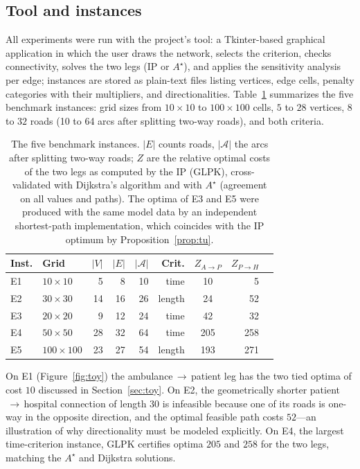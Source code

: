 \documentclass[10pt,twocolumn]{article}
\begin{document}
\subsection{Tool and instances}

All experiments were run with the project's tool: a Tkinter-based graphical application in
which the user draws the network, selects the criterion, checks connectivity, solves the
two legs (IP or $A^{\star}$), and applies the sensitivity analysis per edge; instances are stored as
plain-text files listing vertices, edge cells, penalty categories with their multipliers,
and directionalities. Table~\ref{tab:instances} summarizes the five benchmark instances:
grid sizes from $10\times10$ to $100\times100$ cells, $5$ to $28$ vertices, $8$ to $32$
roads (10 to 64 arcs after splitting two-way roads), and both criteria.

\begin{table}[t]
\centering
\caption{The five benchmark instances. $|E|$ counts roads, $|\mathcal{A}|$ the arcs after
splitting two-way roads; $Z$ are the relative optimal costs of the two legs as computed by
the IP (GLPK), cross-validated with Dijkstra's algorithm and with $A^{\star}$ (agreement on all
values and paths). The optima of E3 and E5 were produced with the same model data by an
independent shortest-path implementation, which coincides with the IP optimum by
Proposition~\ref{prop:tu}.}
\label{tab:instances}
\footnotesize
\setlength{\tabcolsep}{4pt}
\begin{tabular}{@{}llrrrrcrr@{}}
\toprule
Inst. & Grid & $|V|$ & $|E|$ & $|\mathcal{A}|$ & Crit. & $Z_{A\to P}$ & $Z_{P\to H}$ \\
\midrule
E1 & $10\times10$  & 5  & 8  & 10 & time   & 10 & 5 \\
E2 & $30\times30$  & 14 & 16 & 26 & length & 24 & 52 \\
E3 & $20\times20$  & 9  & 12 & 24 & time   & 42 & 32 \\
E4 & $50\times50$  & 28 & 32 & 64 & time   & 205 & 258 \\
E5 & $100\times100$& 23 & 27 & 54 & length & 193 & 271 \\
\bottomrule
\end{tabular}
\end{table}

On E1 (Figure~\ref{fig:toy}) the ambulance$\,\to\,$patient leg has the two tied optima of
cost $10$ discussed in Section~\ref{sec:toy}. On E2, the geometrically shorter
patient$\,\to\,$hospital connection of length $30$ is infeasible because one of its roads is
one-way in the opposite direction, and the optimal feasible path costs $52$---an
illustration of why directionality must be modeled explicitly. On E4, the largest
time-criterion instance, GLPK certifies optima $205$ and $258$ for the two legs, matching
the $A^{\star}$ and Dijkstra solutions.
\end{document}
